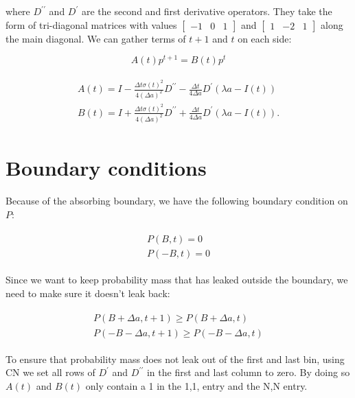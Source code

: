 \documentclass[12pt]{article}
\newcommand{\be}{\begin{equation}}
\newcommand{\ee}{\end{equation}}
\begin{document}
where $D^{\prime \prime}$ and $D^{\prime}$ are the second and first derivative operators. They take the form of tri-diagonal matrices with values $\begin{bmatrix}-1 & 0 & 1 \end{bmatrix}$
 and $\begin{bmatrix}1 & -2 & 1 \end{bmatrix}$
 along the main diagonal. We can gather terms of $t+1$ and $t$ on each side:
 
 \be
 A(t) p^{t+1}  = B(t) p^{t} 
 \ee
 
\begin{align}
\begin{split}
 A(t) =  I -  \frac{\Delta t \sigma(t)^2}{4{{\left(\Delta a\right)}^2}} D^{\prime \prime} - \frac{\Delta t}{4 \Delta a} D^{\prime}  \left(\lambda a - I(t) \right) 
\\
 B(t)  = I +  \frac{\Delta t \sigma(t)^2}{4{{\left(\Delta a\right)}^2}} D^{\prime \prime} + \frac{\Delta t}{4 \Delta a} D^{\prime}  \left(\lambda a - I(t) \right).
\end{split}
\end{align}

\section{Boundary conditions}

Because of the absorbing boundary, we have the following boundary condition on $P$:

\begin{align}
\begin{split}
P(B,t) = 0
\\
P(-B,t) = 0
\end{split}
\end{align}

Since we want to keep probability mass that has leaked outside the boundary, we need to make sure it doesn't leak back:

\begin{align}
\begin{split}
P(B+\Delta a,t+1) \geq P(B+\Delta a, t)
\\
P(-B-\Delta a,t+1) \geq P(-B-\Delta a, t)
\end{split}
\end{align}

To ensure that probability mass does not leak out of the first and last bin, using CN we set all rows of $D^{\prime}$ and $D^{\prime \prime}$ in the first and last column to zero. By doing so $A(t)$ and $B(t)$ only contain a 1 in the 1,1, entry and the N,N entry. 
\end{document}
